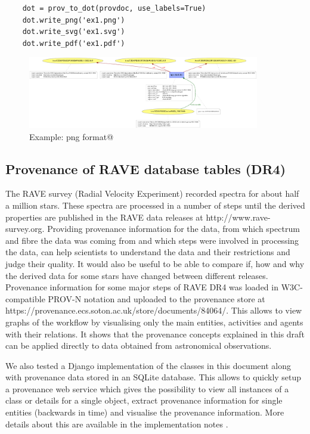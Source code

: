 \begin{verbatim}
    dot = prov_to_dot(provdoc, use_labels=True)
    dot.write_png('ex1.png')
    dot.write_svg('ex1.svg')
    dot.write_pdf('ex1.pdf')
\end{verbatim}

\begin{figure}
\centering
\includegraphics[width=0.9\textwidth]{access_ex1.png}
\caption{Example: png format@}
\label{fig:example}
\end{figure}



\subsection{Provenance of RAVE database tables (DR4)}
The RAVE survey (Radial Velocity Experiment) recorded spectra for about half a 
million stars. These spectra are processed in a number of steps until the 
derived properties are published in the RAVE data releases at http://www.rave-survey.org.
Providing provenance information for the data, from which spectrum and fibre the
data was coming from and which steps were involved in processing the data, can help scientists
to understand the data and their restrictions and judge their quality.
It would also be useful to be able to compare if, how and why the derived data 
for some stars have changed between different releases.
Provenance information for some major steps of RAVE DR4 was loaded in 
W3C-compatible PROV-N notation and uploaded to the provenance store at 
https://provenance.ecs.soton.ac.uk/store/documents/84064/. This allows to view 
graphs of the workflow by visualising only the main entities, activities and agents 
with their relations. It shows that the provenance concepts explained in this draft 
can be applied directly to data obtained from astronomical observations.

We also tested a Django implementation of the classes in this document along with provenance data stored in an SQLite database. This allows to quickly setup a provenance web service
which gives the possibility to view all instances of a class or details for a single object, 
extract provenance information for single entities (backwards in time) and 
visualise the provenance information. 
More details about this are available in the implementation notes \citep{std:ProvenanceImplementationNote}.





